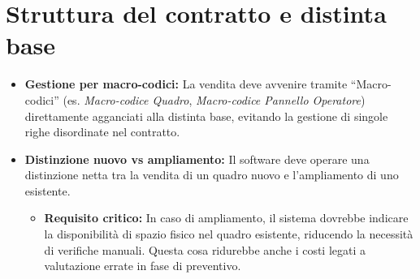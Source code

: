 \documentclass[12pt, a4paper]{article} %
\begin{document}
\section{Struttura del contratto e distinta base}
\begin{itemize}
      \item \textbf{Gestione per macro-codici:}
            La vendita deve avvenire tramite ``Macro-codici'' (es. \textit{Macro-codice Quadro}, \textit{Macro-codice Pannello Operatore})
            direttamente agganciati alla distinta base, evitando la gestione di singole righe disordinate nel contratto.

      \item \textbf{Distinzione nuovo vs ampliamento:}
            Il software deve operare una distinzione netta tra la vendita di un quadro nuovo e l'ampliamento di uno esistente.
            \begin{itemize}
                  \item \textbf{Requisito critico:} In caso di ampliamento, il sistema dovrebbe indicare la disponibilità di spazio fisico nel quadro esistente,
                        riducendo la necessità di verifiche manuali. Questa cosa ridurebbe anche i costi legati a valutazione errate in fase di preventivo.
            \end{itemize}


\end{itemize}
\end{document}
